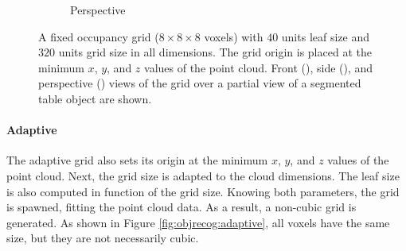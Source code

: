 \begin{figure}[!ht]
\begin{subfigure}{0.325\textwidth}
		\caption{Perspective}
		\label{subfig:objrecog:fixed:persp}
	\end{subfigure}
	\hfill
	\caption{A fixed occupancy grid ($8\times8\times8$ voxels) with $40$ units leaf size and $320$ units grid size in all dimensions. The grid origin is placed at the minimum $x$, $y$, and $z$ values of the point cloud. Front (), side (), and perspective () views of the grid over a partial view of a segmented table object are shown.}
	\label{fig:objrecog:fixed}
\end{figure}

\paragraph{Adaptive}

The adaptive grid also sets its origin at the minimum $x$, $y$, and $z$ values of the point cloud. Next, the grid size is adapted to the cloud dimensions. The leaf size is also computed in function of the grid size. Knowing both parameters, the grid is spawned, fitting the point cloud data. As a result, a non-cubic grid is generated. As shown in Figure \ref{fig:objrecog:adaptive}, all voxels have the same size, but they are not necessarily cubic.

